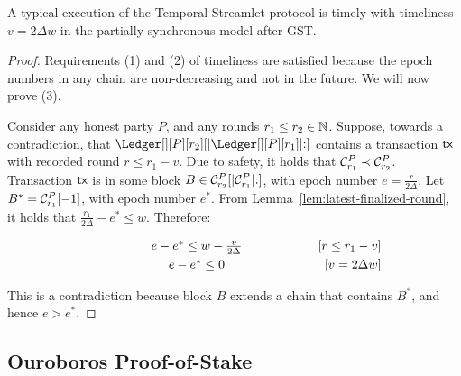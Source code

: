 \begin{theorem}
  A typical execution of the Temporal Streamlet protocol is timely
  with timeliness $v = 2\Delta w$ in the partially synchronous model after GST.
\end{theorem}
\begin{proof}
  Requirements (1) and (2) of timeliness are satisfied because the epoch numbers in any chain
  are non-decreasing and not in the future.
  We will now prove (3).

  Consider any honest party $P$, and any rounds $r_1 \leq r_2 \in \mathbb{N}$.
  Suppose, towards a contradiction, that $\Ledger[][P][r_2][|\Ledger[][P][r_1]|{:}]$
  contains a transaction $\textsf{tx}$ with recorded round $r \leq r_1 - v$.
  Due to safety, it holds that $\mathcal{C}^P_{r_1} \prec \mathcal{C}^P_{r_2}$.
  Transaction $\textsf{tx}$ is in some block $B \in \mathcal{C}^P_{r_2}[|\mathcal{C}^P_{r_1}|{:}]$,
  with epoch number $e = \frac{r}{2\Delta}$.
  Let $B^* = \mathcal{C}^P_{r_1}[-1]$, with epoch number $e^*$.
  From Lemma~\ref{lem:latest-finalized-round}, it holds that
  $\frac{r_1}{2\Delta} - e^* \leq w$. Therefore:

  \begin{align*}
    \makebox[0.5\textwidth][c]{$e - e^* \leq w - \frac{v}{2\Delta}$}         && \text{[$r \leq r_1 - v$]} \\
    \makebox[0.5\textwidth][c]{$e - e^* \leq 0$}                                 && \text{[$v = 2\Delta w$]}
  \end{align*}

  This is a contradiction because block $B$ extends a chain that contains $B^*$,
  and hence $e > e^*$.

  \Qed
\end{proof}


\subsection{Ouroboros Proof-of-Stake}

